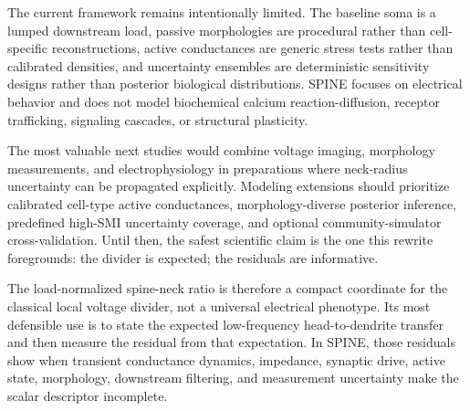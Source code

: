 The current framework remains intentionally limited. The baseline soma is a lumped downstream load, passive morphologies are procedural rather than cell-specific reconstructions, active conductances are generic stress tests rather than calibrated densities, and uncertainty ensembles are deterministic sensitivity designs rather than posterior biological distributions. SPINE focuses on electrical behavior and does not model biochemical calcium reaction-diffusion, receptor trafficking, signaling cascades, or structural plasticity.

The most valuable next studies would combine voltage imaging, morphology measurements, and electrophysiology in preparations where neck-radius uncertainty can be propagated explicitly. Modeling extensions should prioritize calibrated cell-type active conductances, morphology-diverse posterior inference, predefined high-SMI uncertainty coverage, and optional community-simulator cross-validation. Until then, the safest scientific claim is the one this rewrite foregrounds: the divider is expected; the residuals are informative.

The load-normalized spine-neck ratio is therefore a compact coordinate for the classical local voltage divider, not a universal electrical phenotype. Its most defensible use is to state the expected low-frequency head-to-dendrite transfer and then measure the residual from that expectation. In SPINE, those residuals show when transient conductance dynamics, impedance, synaptic drive, active state, morphology, downstream filtering, and measurement uncertainty make the scalar descriptor incomplete.
